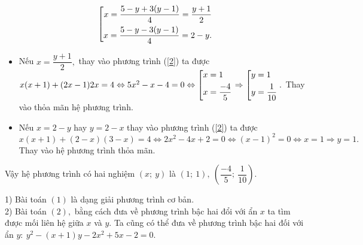 \begin{ex}
{	\[\left[\begin{aligned} x=\dfrac{5-y+3(y-1)}{4}=\dfrac{y+1}{2}\\ x=\dfrac{5-y-3(y-1)}{4}=2-y.\end{aligned}\right.\]
	\begin{itemize}
\item  Nếu $x=\dfrac{y+1}{2},$ thay vào phương trình (\ref{2}) ta được\\ $x(x+1)+(2x-1)2x=4\Leftrightarrow 5x^2-x-4=0\Leftrightarrow\left[\begin{aligned}&x=1\\&x=\dfrac{-4}{5}\end{aligned}\right.\Rightarrow\left[\begin{aligned}&y=1\\&y=\dfrac{1}{10}\end{aligned}\right..$ Thay vào thỏa mãn hệ phương trình.
\item Nếu $x=2-y$ hay $y=2-x$ thay vào phương trình (\ref{2}) ta được $x(x+1)+(2-x)(3-x)=4\Leftrightarrow 2x^2-4x+2=0\Leftrightarrow (x-1)^2=0\Leftrightarrow x=1\Rightarrow y=1.$ Thay vào hệ phương trình thỏa mãn.
\end{itemize}	
	Vậy hệ phương trình có hai nghiệm $(x;\ y)$ là $(1;\ 1),\ (\dfrac{-4}{5};\ \dfrac{1}{10}).$   
    \begin{nx}
    	1) Bài toán $(1)$ là dạng giải phương trình cơ bản.\\
    	2) Bài toán $(2),$ bằng cách đưa về phương trình bậc hai đổi với ẩn $x$ ta tìm được mối liên hệ giữa $x$ và $y.$ Ta cũng có thể đưa về phương trình bậc hai đối với ẩn $y:\ y^2-(x+1)y-2x^2+5x-2=0.$
    \end{nx}
}
	\end{ex}
